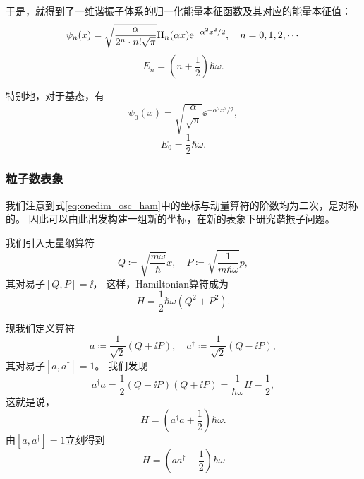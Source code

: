 \begin{tcolorbox}
于是，就得到了一维谐振子体系的归一化能量本征函数及其对应的能量本征值：
\begin{equation}
    \label{eq:onedim_osc_coord_wfn}
    \psi_n(x) = \sqrt{\frac{\alpha}{2^n\cdot n! \sqrt{\pi}}} \mathrm{H}_n(\alpha x) \mathrm{e}^{-\alpha^2 x^2/2}, \quad n=0,1,2,\cdots
\end{equation}
\begin{equation}
    E_n = \left(n+\frac12\right) \hbar\omega.
\end{equation}

特别地，对于基态，有
\begin{equation}
    \psi_0(x) = \sqrt{\frac{\alpha}{\sqrt{\pi}}} \ee^{-\alpha^2 x^2/2},
\end{equation}
\begin{equation}
    E_0 = \frac12 \hbar\omega.
\end{equation}
\end{tcolorbox}


\subsubsection{粒子数表象}

我们注意到式\eqref{eq:onedim_osc_ham}中的坐标与动量算符的阶数均为二次，是对称的。
因此可以由此出发构建一组新的坐标，在新的表象下研究谐振子问题。

我们引入无量纲算符
\begin{equation}
    Q \coloneq \sqrt{\frac{m\omega}{\hbar}} x ,\quad P \coloneq \sqrt{\frac{1}{m\hbar\omega}} p,
\end{equation}
其对易子$[Q,P]=\ii$，
这样，Hamiltonian算符成为
\begin{equation}
    H = \frac12 \hbar\omega (Q^2+P^2).
\end{equation}

现我们定义算符
\begin{equation}
    a \coloneq \frac{1}{\sqrt{2}} (Q+\ii P) ,\quad a^\dag \coloneq \frac{1}{\sqrt{2}} (Q-\ii P),
\end{equation}
其对易子$[a,a^\dag]=1$。
我们发现
\begin{equation}
    a^\dag a = \frac12 (Q-\ii P)(Q+\ii P) = \frac{1}{\hbar\omega} H - \frac12,
\end{equation}
这就是说，
\begin{equation}
    H = (a^\dag a+\frac12)\hbar\omega.
\end{equation}
由$[a,a^\dag]=1$立刻得到
\begin{equation}
    H = (a a^\dag-\frac12)\hbar\omega
\end{equation}

